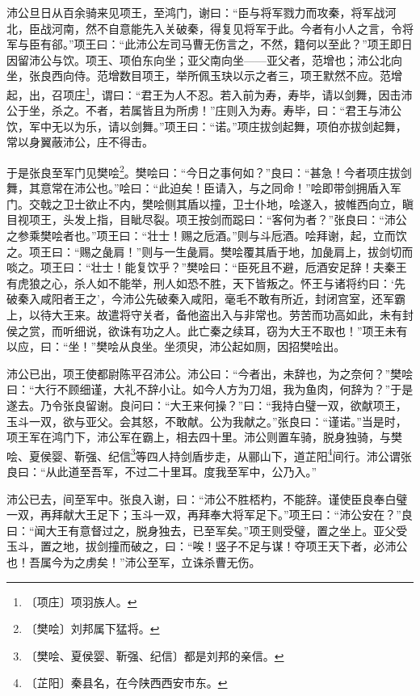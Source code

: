 \documentclass[12pt,UTF-8,openany,a4]{ctexbook}
\begin{document}
\begin{large}
    沛公旦日从百余骑来见项王，至鸿门，谢曰：“臣与将军戮力而攻秦，将军战河北，臣战河南，然不自意能先入关破秦，得复见将军于此。今者有小人之言，令将军与臣有郤。”项王曰：“此沛公左司马曹无伤言之，不然，籍何以至此？”项王即日因留沛公与饮。项王、项伯东向坐；亚父南向坐——亚父者，范增也；沛公北向坐，张良西向侍。范增数目项王，举所佩玉玦以示之者三，项王默然不应。范增起，出，召项庄\footnote{〔项庄〕\yiwen 项羽族人。}，谓曰：“君王为人不忍。若入前为寿，寿毕，请以剑舞，因击沛公于坐，杀之。不者，若属皆且为所虏！”庄则入为寿。寿毕，曰：“君王与沛公饮，军中无以为乐，请以剑舞。”项王曰：“诺。”项庄拔剑起舞，项伯亦拔剑起舞，常以身翼蔽沛公，庄不得击。
    
    于是张良至军门见樊哙\footnote{〔樊哙〕\yiwen 刘邦属下猛将。}。樊哙曰：“今日之事何如？”良曰：“甚急！今者项庄拔剑舞，其意常在沛公也。”哙曰：“此迫矣！臣请入，与之同命！”哙即带剑拥盾入军门。交戟之卫士欲止不内，樊哙侧其盾以撞，卫士仆地，哙遂入，披帷西向立，瞋目视项王，头发上指，目眦尽裂。项王按剑而跽曰：“客何为者？”张良曰：“沛公之参乘樊哙者也。”项王曰：“壮士！赐之卮酒。”则与斗卮酒。哙拜谢，起，立而饮之。项王曰：“赐之彘肩！”则与一生彘肩。樊哙覆其盾于地，加彘肩上，拔剑切而啖之。项王曰：“壮士！能复饮乎？”樊哙曰：“臣死且不避，卮酒安足辞！夫秦王有虎狼之心，杀人如不能举，刑人如恐不胜，天下皆叛之。怀王与诸将约曰：‘先破秦入咸阳者王之’，今沛公先破秦入咸阳，毫毛不敢有所近，封闭宫室，还军霸上，以待大王来。故遣将守关者，备他盗出入与非常也。劳苦而功高如此，未有封侯之赏，而听细说，欲诛有功之人。此亡秦之续耳，窃为大王不取也！”项王未有以应，曰：“坐！”樊哙从良坐。坐须臾，沛公起如厕，因招樊哙出。
    
    沛公已出，项王使都尉陈平召沛公。沛公曰：“今者出，未辞也，为之奈何？”樊哙曰：“大行不顾细谨，大礼不辞小让。如今人方为刀俎，我为鱼肉，何辞为？”于是遂去。乃令张良留谢。良问曰：“大王来何操？”曰：“我持白璧一双，欲献项王，玉斗一双，欲与亚父。会其怒，不敢献。公为我献之。”张良曰：“谨诺。”当是时，项王军在鸿门下，沛公军在霸上，相去四十里。沛公则置车骑，脱身独骑，与樊哙、夏侯婴、靳强、纪信\footnote{〔樊哙、夏侯婴、靳强、纪信〕\yiwen 都是刘邦的亲信。}等四人持剑盾步走，从郦山下，道芷阳\footnote{〔芷阳〕\yiwen 秦县名，在今陕西西安市东。}间行。沛公谓张良曰：“从此道至吾军，不过二十里耳。度我至军中，公乃入。”
    
    沛公已去，间至军中。张良入谢，曰：“沛公不胜桮杓，不能辞。谨使臣良奉白璧一双，再拜献大王足下；玉斗一双，再拜奉大将军足下。”项王曰：“沛公安在？”良曰：“闻大王有意督过之，脱身独去，已至军矣。”项王则受璧，置之坐上。亚父受玉斗，置之地，拔剑撞而破之，曰：“唉！竖子不足与谋！夺项王天下者，必沛公也！吾属今为之虏矣！”沛公至军，立诛杀曹无伤。
\end{large}
\end{document}
